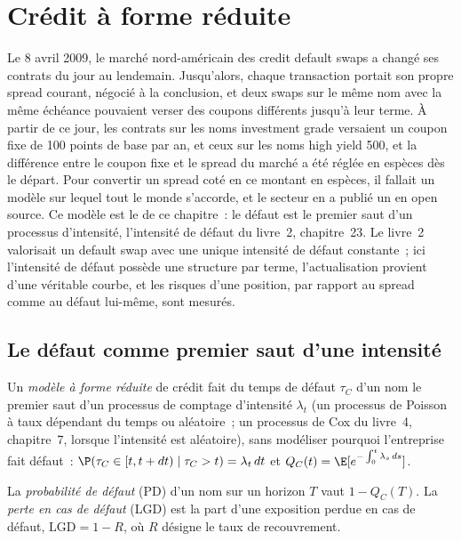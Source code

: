\chapter{Crédit à forme réduite}\label{ch:rc:reduced-form-credit}

Le 8 avril 2009, le marché nord-américain des credit default swaps a changé ses contrats
du jour au lendemain. Jusqu'alors, chaque transaction portait son propre spread courant, négocié à
la conclusion, et deux swaps sur le même nom avec la même échéance pouvaient
verser des coupons différents jusqu'à leur terme. À partir de ce jour, les contrats sur les noms investment grade versaient un coupon fixe de 100
points de base par an, et ceux sur les noms high yield 500, et la différence entre le
coupon fixe et le spread du marché a été réglée en espèces dès le départ. Pour convertir un
spread coté en ce montant en espèces, il fallait un modèle sur lequel tout le monde s'accorde, et
le secteur en a publié un en open source. Ce modèle est le  de ce chapitre~:
le défaut est le premier saut d'un processus d'intensité, l'intensité de défaut du
livre~2, chapitre~23. Le livre~2 valorisait un default swap avec une unique intensité de défaut constante~; ici
l'intensité de défaut possède une structure par terme, l'actualisation provient d'une véritable courbe, et les
risques d'une position, par rapport au spread comme au défaut lui-même, sont mesurés.

\section{Le défaut comme premier saut d'une intensité}

\begin{definition}\label{def:rc:reduced-form-credit:reduced}
Un \emph{modèle à forme réduite} de crédit fait du temps de
défaut $\tau_C$ d'un nom le premier saut d'un processus de comptage d'intensité $\lambda_t$ (un
processus de Poisson à taux dépendant du temps ou aléatoire~; un processus de Cox du
livre~4, chapitre~7, lorsque l'intensité est aléatoire), sans modéliser pourquoi l'entreprise fait défaut~:
$\P(\tau_C\in[t,t+dt)\mid\tau_C>t) = \lambda_t\,dt$ et $Q_C(t) = \E[e^{-\int_0^t\lambda_s\,ds}]$.
\end{definition}

\begin{definition}\label{def:rc:reduced-form-credit:pd}
La \emph{probabilité de défaut} (PD) d'un nom sur un horizon
$T$ vaut $1-Q_C(T)$. La \emph{perte en cas de défaut}
(LGD) est la part d'une exposition perdue en cas de défaut, $\mathrm{LGD} = 1-R$, où $R$ désigne le
taux de recouvrement.
\end{definition}


